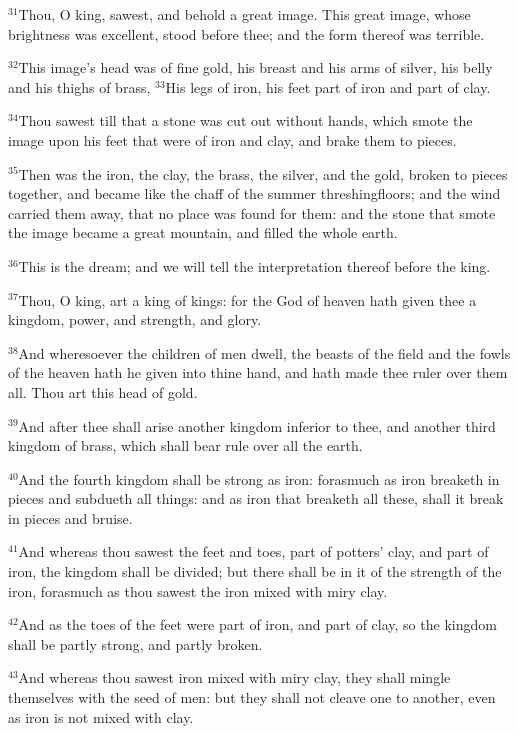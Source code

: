 \documentclass[12pt]{article}
\begin{document}
$^{31}$Thou, O king, sawest, and behold a great image. This great image,
whose brightness was excellent, stood before thee; and the form
thereof was terrible.


$^{32}$This image's head was of fine gold, his breast and his arms of
silver, his belly and his thighs of brass, $^{33}$His legs of iron, his
feet part of iron and part of clay.


$^{34}$Thou sawest till that a stone was cut out without hands, which
smote the image upon his feet that were of iron and clay, and brake
them to pieces.


$^{35}$Then was the iron, the clay, the brass, the silver, and the gold,
broken to pieces together, and became like the chaff of the summer
threshingfloors; and the wind carried them away, that no place was
found for them: and the stone that smote the image became a great
mountain, and filled the whole earth.


$^{36}$This is the dream; and we will tell the interpretation thereof
before the king.


$^{37}$Thou, O king, art a king of kings: for the God of heaven hath
given thee a kingdom, power, and strength, and glory.


$^{38}$And wheresoever the children of men dwell, the beasts of the
field and the fowls of the heaven hath he given into thine hand, and
hath made thee ruler over them all. Thou art this head of gold.


$^{39}$And after thee shall arise another kingdom inferior to thee, and
another third kingdom of brass, which shall bear rule over all the
earth.


$^{40}$And the fourth kingdom shall be strong as iron: forasmuch as iron
breaketh in pieces and subdueth all things: and as iron that breaketh
all these, shall it break in pieces and bruise.


$^{41}$And whereas thou sawest the feet and toes, part of potters' clay,
and part of iron, the kingdom shall be divided; but there shall be in
it of the strength of the iron, forasmuch as thou sawest the iron
mixed with miry clay.


$^{42}$And as the toes of the feet were part of iron, and part of clay,
so the kingdom shall be partly strong, and partly broken.


$^{43}$And whereas thou sawest iron mixed with miry clay, they shall
mingle themselves with the seed of men: but they shall not cleave one
to another, even as iron is not mixed with clay.
\end{document}
